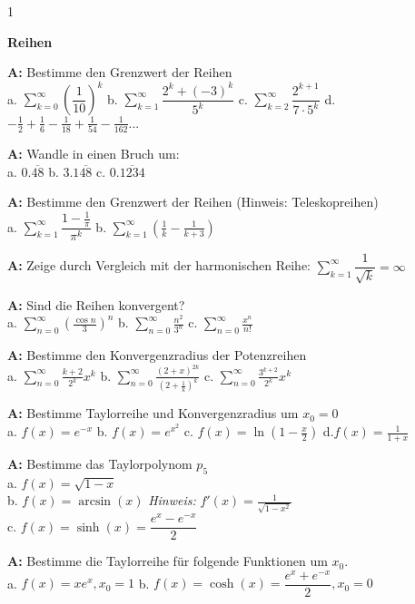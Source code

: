 \documentclass[landscape,twocolumn,a4paper]{article}
\begin{document}
\setcounter {y} {1}
\parindent 0mm


\textbf{Reihen}
\bigskip 

\textbf{A:}   
Bestimme den Grenzwert der Reihen \\
a. $\sum\limits_{k=0}^\infty (\dfrac{1}{10})^k$ \quad
b. $\sum\limits_{k=1}^\infty \dfrac{2^k+(-3)^k}{5^k}$ \quad
c. $\sum\limits_{k=2}^\infty \dfrac{2^{k+1}}{7 \cdot 5^k}$  \quad
d. $-\frac{1}{2} + \frac{1}{6} - \frac{1}{18} + \frac{1}{54} - \frac{1}{162} ...$
\bigskip  {}

\textbf{A:}  
Wandle in einen Bruch um: \\
a. $0.\overline{48}$ \quad b. $3.1\overline{48}$ \quad c. $0.\overline{1234}$
\bigskip {}
 

\textbf{A:}   
Bestimme den Grenzwert der Reihen (Hinweis: Teleskopreihen) \\
a. $\sum\limits_{k=1}^\infty \dfrac{1-\frac{1}{\pi}}{\pi^k}$ \quad
b. $\sum\limits_{k=1}^\infty (\frac{1}{k}-\frac{1}{k+3})$ \quad
\bigskip {}

\textbf{A:}   
Zeige durch Vergleich mit der harmonischen Reihe: \quad
$\sum\limits_{k=1}^\infty \dfrac{1}{\sqrt{k}}= \infty$  
\bigskip {}

\textbf{A:}   
Sind die Reihen konvergent? \\
a. $\sum\limits_{n=0}^\infty (\frac{\cos n}{3})^n$   \quad
b. $\sum\limits_{n=0}^\infty \frac{n^2}{3^n}$   \quad
c. $\sum\limits_{n=0}^\infty \frac{x^n}{n!}$   \quad
\bigskip {}


\textbf{A:}   
Bestimme den Konvergenzradius der Potenzreihen \\
a. $\sum\limits_{n=0}^\infty \frac{k+2}{2^k}x^k$   \quad
b. $\sum\limits_{n=0}^\infty \frac{(2+x)^{2k}}{(2+\frac{1}{k})^k}$   \quad
c. $\sum\limits_{n=0}^\infty \frac{3^{k+2}}{2^k}x^k$   \quad
\bigskip {}

\textbf{A:}   
Bestimme Taylorreihe und Konvergenzradius um $x_0 =0$ \\
a. $f(x) = e^{-x}$   \quad b. $f(x) = e^{x^2}$ \quad c. $f(x) = \ln(1-\frac{x}{2})$ \quad d.$f(x) = \frac{1}{1+x}$
\bigskip {}

\textbf{A:}   
Bestimme das Taylorpolynom $p_5$ \\
a. $f(x) = \sqrt{1-x}$  \\
b. $f(x) = \arcsin(x)$ \quad \textit{Hinweis:} $f'(x) = \frac{1}{\sqrt{1-x^2}}$ \\
c. $f(x) = \sinh(x) = \dfrac{e^x-e^{-x}}{2}$ 

\bigskip {}
\textbf{A:} 
Bestimme die Taylorreihe für folgende Funktionen um $x_0$. \\
a. $f(x) = x e^x, x_0 = 1$  \quad
b. $f(x) =\cosh(x) = \dfrac{e^x+e^{-x}}{2}, x_0 = 0$ 
 
\bigskip 


 
\end{document}
